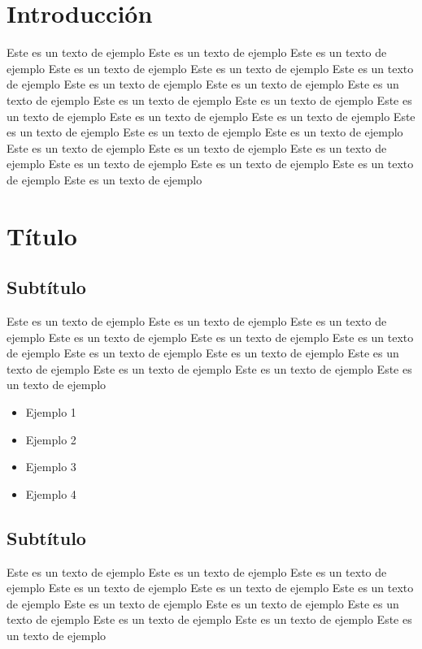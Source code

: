 \documentclass[a4paper, 12pt]{article}
\begin{document}
    \section{\textcolor{rojoPortada}{Introducción}}
    Este es un texto de ejemplo Este es un texto de ejemplo Este es un texto de ejemplo Este es un texto de ejemplo Este es un texto de ejemplo Este es un texto de ejemplo Este es un texto de ejemplo Este es un texto de ejemplo Este es un texto de ejemplo Este es un texto de ejemplo Este es un texto de ejemplo Este es un texto de ejemplo Este es un texto de ejemplo Este es un texto de ejemplo Este es un texto de ejemplo Este es un texto de ejemplo Este es un texto de ejemplo Este es un texto de ejemplo Este es un texto de ejemplo Este es un texto de ejemplo Este es un texto de ejemplo Este es un texto de ejemplo Este es un texto de ejemplo Este es un texto de ejemplo 
    \clearpage

    \section{Título}
    \subsection{Subtítulo}
    Este es un texto de ejemplo Este es un texto de ejemplo Este es un texto de ejemplo Este es un texto de ejemplo Este es un texto de ejemplo Este es un texto de ejemplo Este es un texto de ejemplo Este es un texto de ejemplo Este es un texto de ejemplo Este es un texto de ejemplo Este es un texto de ejemplo Este es un texto de ejemplo 

    \begin{itemize}
        \item Ejemplo 1
        \item Ejemplo 2
        \item Ejemplo 3
        \item Ejemplo 4
    \end{itemize} 

    \subsection{Subtítulo}
    Este es un texto de ejemplo Este es un texto de ejemplo Este es un texto de ejemplo Este es un texto de ejemplo Este es un texto de ejemplo Este es un texto de ejemplo Este es un texto de ejemplo Este es un texto de ejemplo Este es un texto de ejemplo Este es un texto de ejemplo Este es un texto de ejemplo Este es un texto de ejemplo
    \clearpage
\end{document}
